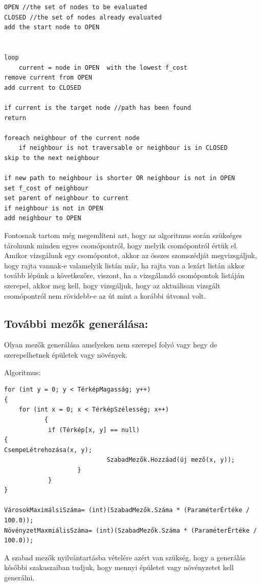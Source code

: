 \begin{verbatim}
OPEN //the set of nodes to be evaluated
CLOSED //the set of nodes already evaluated
add the start node to OPEN


loop
	current = node in OPEN  with the lowest f_cost
remove current from OPEN
add current to CLOSED

if current is the target node //path has been found
return

foreach neighbour of the current node
	if neighbour is not traversable or neighbour is in CLOSED
skip to the next neighbour

if new path to neighbour is shorter OR neighbour is not in OPEN
set f_cost of neighbour
set parent of neighbour to current
if neighbour is not in OPEN
add neighbour to OPEN
\end{verbatim}

Fontosnak tartom még megemlíteni azt, hogy az algoritmus során szükséges tárolnunk minden egyes csomópontról, hogy melyik csomópontról értük el. Amikor vizsgálunk egy csomópontot, akkor az összes szomszédját megvizsgáljuk, hogy rajta vannak-e valamelyik listán már, ha rajta van a lezárt listán akkor tovább lépünk a következőre, viszont, ha a vizsgálandó csomópontok listáján szerepel, akkor meg kell, hogy vizsgáljuk, hogy az aktuálisan vizsgált csomópontról nem rövidebb-e az út mint a korábbi útvonal volt.

\subsection{További mezők generálása:}

Olyan mezők generálása amelyeken nem szerepel folyó vagy hegy de szerepelhetnek épületek vagy növények.

Algoritmus:     

\begin{verbatim}
for (int y = 0; y < TérképMagasság; y++)
{
 	for (int x = 0; x < TérképSzélesség; x++)
           {
           	if (Térkép[x, y] == null)
{
CsempeLétrehozása(x, y);
                    		SzabadMezők.Hozzáad(új mező(x, y));
                	}
            }
}

VárosokMaximálsiSzáma= (int)(SzabadMezők.Száma * (ParaméterÉrtéke / 100.0));
NövényzetMaxmiálisSzáma= (int)(SzabadMezők.Száma * (ParaméterÉrtéke / 100.0));
\end{verbatim}

A szabad mezők nyilvántartásba vételére azért van szükség, hogy a generálás későbbi szakaszaiban tudjuk, hogy mennyi épületet vagy növényzetet kell generálni.

